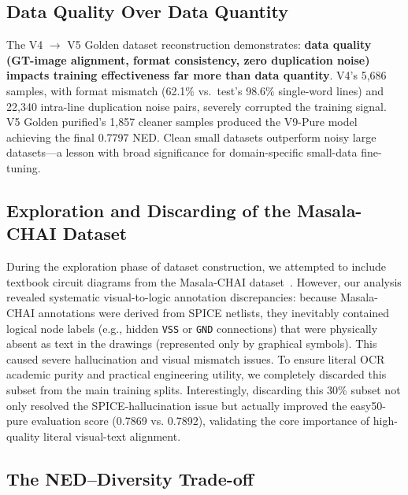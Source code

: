 \subsection{Data Quality Over Data Quantity}

The V4 $\to$ V5 Golden dataset reconstruction demonstrates: \textbf{data quality (GT-image alignment, format consistency, zero duplication noise) impacts training effectiveness far more than data quantity}. V4's 5,686 samples, with format mismatch (62.1\% vs.\ test's 98.6\% single-word lines) and 22,340 intra-line duplication noise pairs, severely corrupted the training signal. V5 Golden purified's 1,857 cleaner samples produced the V9-Pure model achieving the final 0.7797 NED. Clean small datasets outperform noisy large datasets---a lesson with broad significance for domain-specific small-data fine-tuning.

\subsection{Exploration and Discarding of the Masala-CHAI Dataset}

During the exploration phase of dataset construction, we attempted to include textbook circuit diagrams from the Masala-CHAI dataset~\citep{bhandari2025masalachai}. However, our analysis revealed systematic visual-to-logic annotation discrepancies: because Masala-CHAI annotations were derived from SPICE netlists, they inevitably contained logical node labels (e.g., hidden \texttt{VSS} or \texttt{GND} connections) that were physically absent as text in the drawings (represented only by graphical symbols). This caused severe hallucination and visual mismatch issues. To ensure literal OCR academic purity and practical engineering utility, we completely discarded this subset from the main training splits. Interestingly, discarding this 30\% subset not only resolved the SPICE-hallucination issue but actually improved the easy50-pure evaluation score (0.7869 vs. 0.7892), validating the core importance of high-quality literal visual-text alignment.

\subsection{The NED--Diversity Trade-off}



